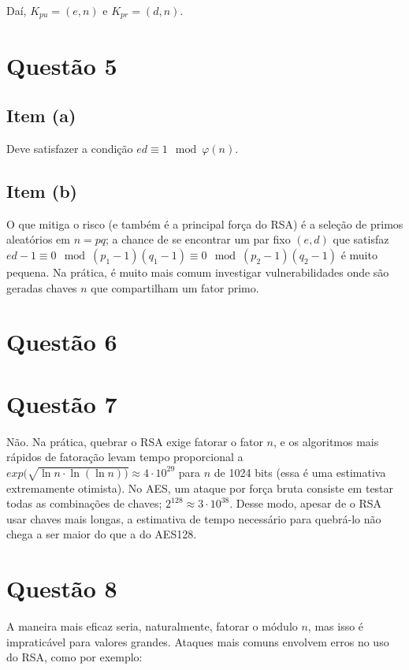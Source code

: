 \documentclass{article}
\begin{document}
Daí, $K_{pu} = (e, n)$ e $K_{pr} = (d, n)$.

\section*{Questão 5}

\subsection*{Item (a)}

Deve satisfazer a condição $ed \equiv 1 \mod \varphi(n)$.

\subsection*{Item (b)}

O que mitiga o risco (e também é a principal força do RSA) é a seleção de primos aleatórios em $n = pq$; a chance de se encontrar um par fixo $(e,d)$ que satisfaz $ed-1 \equiv 0 \mod (p_1-1)(q_1-1) \equiv 0 \mod (p_2-1)(q_2-1)$ é muito pequena. Na prática, é muito mais comum investigar vulnerabilidades onde são geradas chaves $n$ que compartilham um fator primo.

\section*{Questão 6}


\section*{Questão 7}

Não. Na prática, quebrar o RSA exige fatorar o fator $n$, e os algoritmos mais rápidos de fatoração levam tempo proporcional a $exp(\sqrt{\ln n \cdot \ln(\ln n))} \approx 4 \cdot 10^{29}$ para $n$ de 1024 bits (essa é uma estimativa extremamente otimista). No AES, um ataque por força bruta consiste em testar todas as combinações de chaves; $2^{128} \approx 3 \cdot 10^{38}$. Desse modo, apesar de o RSA usar chaves mais longas, a estimativa de tempo necessário para quebrá-lo não chega a ser maior do que a do AES128.

\section*{Questão 8}

A maneira mais eficaz seria, naturalmente, fatorar o módulo $n$, mas isso é impraticável para valores grandes. Ataques mais comuns envolvem erros no uso do RSA, como por exemplo:
\end{document}
